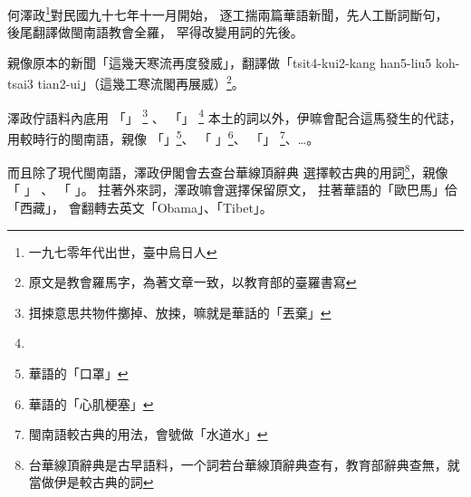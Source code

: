 何澤政\footnote{一九七零年代出世，臺中烏日人}對民國九十七年十一月開始，
逐工揣兩篇華語新聞，先人工斷詞斷句，
後尾翻譯做閩南語教會全羅，
罕得改變用詞的先後。

親像原本的新聞「這幾天寒流再度發威」，翻譯做「tsit4-kui2-kang han5-liu5 koh-tsai3 tian2-ui」（這幾工寒流閣再展威）\footnote{原文是教會羅馬字，為著文章一致，以教育部的臺羅書寫}。

澤政佇語料內底用
「」
\footnote{挕捒意思共物件擲掉、放捒，嘛就是華話的「丟棄」
}
、
「」
\footnote{
}
本土的詞以外，伊嘛會配合這馬發生的代誌，用較時行的閩南語，親像
「」\footnote{華語的「口罩」}、
「
」\footnote{華語的「心肌梗塞」}、
「」
\footnote{閩南語較古典的用法，會號做「水道水」}、…。

而且除了現代閩南語，澤政伊閣會去查台華線頂辭典\cite{台華線頂辭典}
選擇較古典的用詞\footnote{台華線頂辭典是古早語料，一个詞若台華線頂辭典查有，教育部辭典查無，就當做伊是較古典的詞}，親像
「
」
、
「
」。
拄著外來詞，澤政嘛會選擇保留原文，
拄著華語的「歐巴馬」佮「西藏」，
會翻轉去英文「Obama」、「Tibet」。

